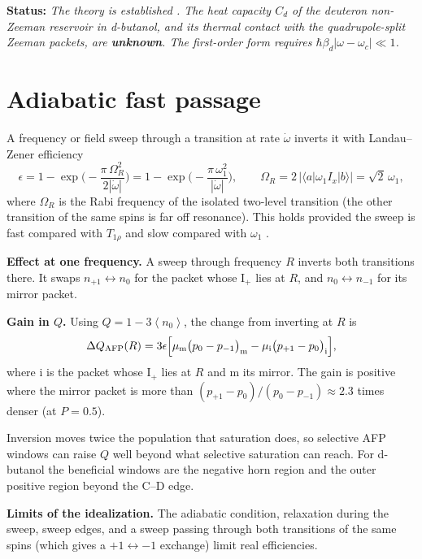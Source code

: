 \documentclass[11pt]{article}
\newcommand{\ket}[1]{\lvert #1\rangle}
\newcommand{\bra}[1]{\langle #1\rvert}
\newcommand{\avg}[1]{\left\langle #1\right\rangle}
\newcommand{\status}[1]{\par\noindent\textbf{\textsf{Status:}} \emph{#1}\par}
\begin{document}
\status{The theory is established \cite{Provotorov1962,Goldman1970,AbragamGoldman1982}. The
heat capacity $C_d$ of the deuteron non-Zeeman reservoir in d-butanol, and its thermal contact
with the quadrupole-split Zeeman packets, are \textbf{unknown}. The first-order form requires
$\hbar\beta_d|\omega-\omega_c|\ll1$.}

\section{Adiabatic fast passage}
\label{sec:afp}
A frequency or field sweep through a transition at rate $\dot\omega$ inverts it with
Landau--Zener efficiency
\begin{equation}
\epsilon=1-\exp\!\Big(-\frac{\pi\,\Omega_R^2}{2|\dot\omega|}\Big)=1-\exp\!\Big(-\frac{\pi\,\omega_1^2}{|\dot\omega|}\Big),
\qquad \Omega_R=2\,|\bra{a}\omega_1 I_x\ket{b}|=\sqrt2\,\omega_1 ,
\end{equation}
where $\Omega_R$ is the Rabi frequency of the isolated two-level transition (the other
transition of the same spins is far off resonance). This holds provided the sweep is fast
compared with $T_{1\rho}$ and slow compared with
$\omega_1$ \cite{Abragam1961,Slichter1990,GarwoodDelaBarre2001}.

\textbf{Effect at one frequency.} A sweep through frequency $R$ inverts both transitions
there. It swaps $n_{+1}\leftrightarrow n_0$ for the packet whose I$_+$ lies at $R$, and
$n_0\leftrightarrow n_{-1}$ for its mirror packet.

\textbf{Gain in $Q$.} Using $Q=1-3\avg{n_0}$, the change from inverting at $R$ is
\begin{equation}
\Delta Q_{\rm AFP}(R)=3\epsilon\Big[\mu_{\rm m}\big(p_0-p_{-1}\big)_{\rm m}-\mu_{\rm i}\big(p_{+1}-p_0\big)_{\rm i}\Big],
\label{eq:afpgain}
\end{equation}
where i is the packet whose I$_+$ lies at $R$ and m its mirror. The gain is positive where the
mirror packet is more than $(p_{+1}-p_0)/(p_0-p_{-1})\approx2.3$ times denser (at $P=0.5$).

Inversion moves twice the population that saturation does, so selective AFP windows can raise
$Q$ well beyond what selective saturation can reach. For d-butanol the beneficial windows are
the negative horn region and the outer positive region beyond the C--D edge.

\textbf{Limits of the idealization.} The adiabatic condition, relaxation during the sweep,
sweep edges, and a sweep passing through both transitions of the same spins (which gives a
$+1\leftrightarrow-1$ exchange) limit real efficiencies.
\end{document}
